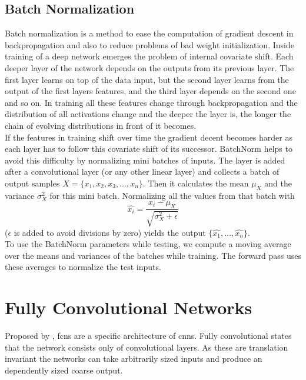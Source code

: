 \subsection{Batch Normalization} %
\label{sub:conepts:nn:batchnorm}
Batch normalization \citep{ioffe_batch_2015} is a method to ease the computation of gradient descent in backpropagation and also to reduce problems of bad weight initialization. Inside training of a deep network emerges the problem of internal covariate shift. Each deeper layer of the network depends on the outputs from its previous layer. The first layer learns on top of the data input, but the second layer learns from the output of the first layers features, and the third layer depends on the second one and so on. In training all these features change through backpropagation and the distribution of all activations change and the deeper the layer is, the longer the chain of evolving distributions in front of it becomes.\\
If the features in training shift over time the gradient decent becomes harder as each layer has to follow this covariate shift of its successor. BatchNorm helps to avoid this difficulty by normalizing mini batches of inputs. The layer is added after a convolutional layer (or any other linear layer) and collects a batch of output samples $X = \{x_1, x_2, x_3, \dots, x_n\}$. Then it calculates the mean $\mu_X$ and the variance $\sigma_X^2$ for this mini batch. Normalizing all the values from that batch with
\begin{equation}
    \hat{x_i} = \frac{x_i - \mu_X}{\sqrt{\sigma_X^2 + \epsilon}}
\end{equation}
($\epsilon$ is added to avoid divisions by zero) yields the output $\{\hat{x_1},\dots,\hat{x_n}\}$.\\
To use the BatchNorm parameters while testing, we compute a moving average over the means and variances of the batches while training. The forward pass uses these averages to normalize the test inputs.

\section{Fully Convolutional Networks}
\label{sec:concepts:fcn}
Proposed by \citet{long_fully_2015}, \glspl{fcn} are a specific architecture of \glspl{cnn}. Fully convolutional states that the network consists only of convolutional layers. As these are translation invariant the networks can take arbitrarily sized inputs and produce an dependently sized coarse output.

